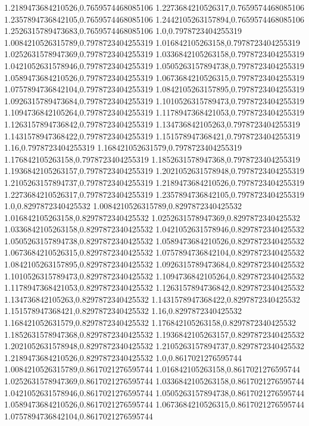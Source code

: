 1.2189473684210526,0.7659574468085106
1.2273684210526317,0.7659574468085106
1.2357894736842105,0.7659574468085106
1.2442105263157894,0.7659574468085106
1.2526315789473683,0.7659574468085106
1.0,0.7978723404255319
1.0084210526315789,0.7978723404255319
1.016842105263158,0.7978723404255319
1.0252631578947369,0.7978723404255319
1.0336842105263158,0.7978723404255319
1.0421052631578946,0.7978723404255319
1.0505263157894738,0.7978723404255319
1.0589473684210526,0.7978723404255319
1.0673684210526315,0.7978723404255319
1.0757894736842104,0.7978723404255319
1.0842105263157895,0.7978723404255319
1.0926315789473684,0.7978723404255319
1.1010526315789473,0.7978723404255319
1.1094736842105264,0.7978723404255319
1.1178947368421053,0.7978723404255319
1.1263157894736842,0.7978723404255319
1.134736842105263,0.7978723404255319
1.1431578947368422,0.7978723404255319
1.151578947368421,0.7978723404255319
1.16,0.7978723404255319
1.168421052631579,0.7978723404255319
1.176842105263158,0.7978723404255319
1.1852631578947368,0.7978723404255319
1.1936842105263157,0.7978723404255319
1.2021052631578948,0.7978723404255319
1.2105263157894737,0.7978723404255319
1.2189473684210526,0.7978723404255319
1.2273684210526317,0.7978723404255319
1.2357894736842105,0.7978723404255319
1.0,0.8297872340425532
1.0084210526315789,0.8297872340425532
1.016842105263158,0.8297872340425532
1.0252631578947369,0.8297872340425532
1.0336842105263158,0.8297872340425532
1.0421052631578946,0.8297872340425532
1.0505263157894738,0.8297872340425532
1.0589473684210526,0.8297872340425532
1.0673684210526315,0.8297872340425532
1.0757894736842104,0.8297872340425532
1.0842105263157895,0.8297872340425532
1.0926315789473684,0.8297872340425532
1.1010526315789473,0.8297872340425532
1.1094736842105264,0.8297872340425532
1.1178947368421053,0.8297872340425532
1.1263157894736842,0.8297872340425532
1.134736842105263,0.8297872340425532
1.1431578947368422,0.8297872340425532
1.151578947368421,0.8297872340425532
1.16,0.8297872340425532
1.168421052631579,0.8297872340425532
1.176842105263158,0.8297872340425532
1.1852631578947368,0.8297872340425532
1.1936842105263157,0.8297872340425532
1.2021052631578948,0.8297872340425532
1.2105263157894737,0.8297872340425532
1.2189473684210526,0.8297872340425532
1.0,0.8617021276595744
1.0084210526315789,0.8617021276595744
1.016842105263158,0.8617021276595744
1.0252631578947369,0.8617021276595744
1.0336842105263158,0.8617021276595744
1.0421052631578946,0.8617021276595744
1.0505263157894738,0.8617021276595744
1.0589473684210526,0.8617021276595744
1.0673684210526315,0.8617021276595744
1.0757894736842104,0.8617021276595744
